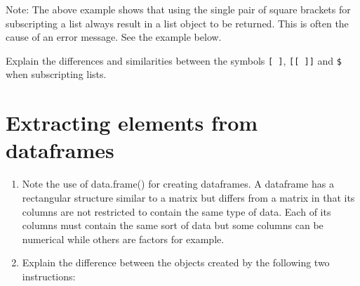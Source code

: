\documentclass[
]{book}
\newenvironment{Shaded}{\begin{snugshade}}{\end{snugshade}}
\newcommand{\CommentTok}[1]{\textcolor[rgb]{0.56,0.35,0.01}{\textit{#1}}}
\newcommand{\DecValTok}[1]{\textcolor[rgb]{0.00,0.00,0.81}{#1}}
\newcommand{\FunctionTok}[1]{\textcolor[rgb]{0.13,0.29,0.53}{\textbf{#1}}}
\newcommand{\NormalTok}[1]{#1}
\newcommand{\SpecialCharTok}[1]{\textcolor[rgb]{0.81,0.36,0.00}{\textbf{#1}}}
\begin{document}
Note: The above example shows that using the single pair of square brackets for subscripting a list always result in a list object to be returned. This is often the cause of an error message. See the example below.

\begin{Shaded}
\end{Shaded}

Explain the differences and similarities between the symbols \texttt{{[}\ {]}}, \texttt{{[}{[}\ {]}{]}} and \texttt{\$} when subscripting lists.

\section{Extracting elements from dataframes}\label{extracting-elements-from-dataframes}

\begin{enumerate}
\def\labelenumi{(\alph{enumi})}
\item
  Note the use of data.frame() for creating dataframes. A dataframe has a rectangular structure similar to a matrix but differs from a matrix in that its columns are not restricted to contain the same type of data. Each of its columns must contain the same sort of data but some columns can be numerical while others are factors for example.
\item
  Explain the difference between the objects created by the following two instructions:
\end{enumerate}
\end{document}
